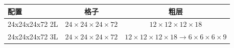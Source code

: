 \begin{tabular}{l c c}
\hline
配置 & 格子 & 粗层 \\
\hline
24x24x24x72 2L & $24\times24\times24\times72$ & $12\times12\times12\times18$ \\
24x24x24x72 3L & $24\times24\times24\times72$ & $12\times12\times12\times18 \to 6\times6\times6\times9$ \\
\hline
\end{tabular}
